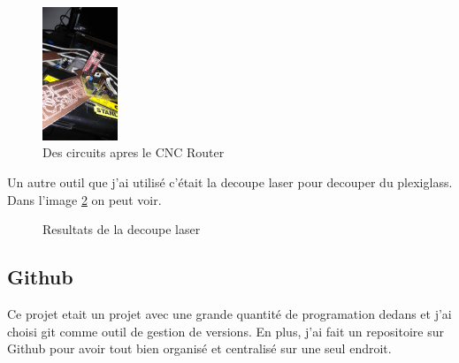 \documentclass[12pt]{article}
\begin{document}
\begin{figure}[!htb]
\centering
\includegraphics[width=0.2\textwidth]{img/CircuitosCNCed.jpg}
\caption{Des circuits apres le CNC Router}
\label{img:CircuitsCNCd}
\end{figure}
Un autre outil que j'ai utilis\'e c'\'etait la decoupe laser pour decouper du plexiglass.
Dans l'image \ref{img:barriere} on peut voir.


\begin{figure}[!htb]
	\centering
	\caption{Resultats de la decoupe laser}
	\label{img:barriere}
\end{figure}


\subsection{Github}
\begin{par}
	Ce projet etait un projet avec une grande 
	quantit\'e de programation dedans et j'ai choisi 
	git comme outil de gestion de versions. En plus,
	j'ai fait un repositoire sur Github pour avoir tout
	bien organis\'e et centralis\'e sur une seul 
	endroit.
\end{par}
\end{document}
